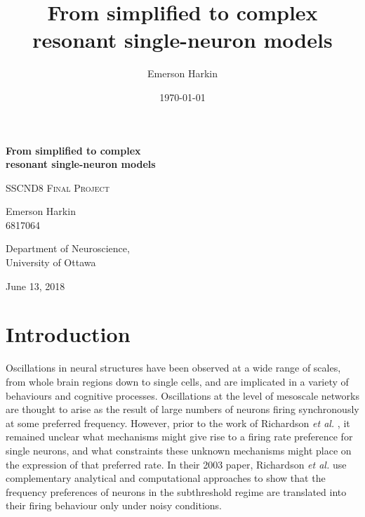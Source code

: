 \documentclass[12pt]{article}
\title{From simplified to complex\\resonant single-neuron models}
\date{\today}
\author{Emerson Harkin}
\begin{document}
\begin{titlepage}

    \singlespacing
    \centering
    \vspace*{3cm}
    {\LARGE \bfseries From simplified to complex\\resonant single-neuron models \par}
    \vspace{1.5cm}
    {\large \scshape SSCND8 Final Project \par}
    \vspace{3cm}
    {\Large Emerson Harkin \\ 6817064 \par}
    \vfill
    {\large Department of Neuroscience, \\ University of Ottawa \par}
    \vfill
    {\large June 13, 2018}

\end{titlepage}

{}

\newpage
{}
\tableofcontents
\listoffigures

\newpage
{}

\section{Introduction}

Oscillations in neural structures have been observed at a wide range of scales, from whole brain regions down to single cells, and are implicated in a variety of behaviours and cognitive processes.
Oscillations at the level of mesoscale networks are thought to arise as the result of large numbers of neurons firing synchronously at some preferred frequency.
However, prior to the work of Richardson \textit{et al.} \cite{richardson_subthreshold_2003}, it remained unclear what mechanisms might give rise to a firing rate preference for single neurons, and what constraints these unknown mechanisms might place on the expression of that preferred rate.
In their 2003 paper, Richardson \textit{et al.} use complementary analytical and computational approaches to show that the frequency preferences of neurons in the subthreshold regime are translated into their firing behaviour only under noisy conditions.
\end{document}

